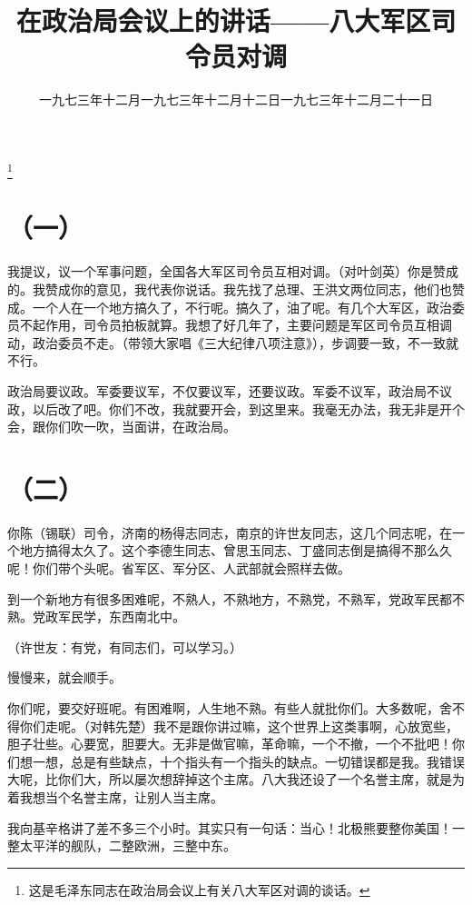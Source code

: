 
\title{在政治局会议上的讲话——八大军区司令员对调}
\date{一九七三年十二月}
\thanks{这是毛泽东同志在政治局会议上有关八大军区对调的谈话。}
\maketitle

\date{一九七三年十二月十二日}
\section*{（一）}

我提议，议一个军事问题，全国各大军区司令员互相对调。（对叶剑英）你是赞成的。我赞成你的意见，我代表你说话。我先找了总理、王洪文两位同志，他们也赞成。一个人在一个地方搞久了，不行呢。搞久了，油了呢。有几个大军区，政治委员不起作用，司令员拍板就算。我想了好几年了，主要问题是军区司令员互相调动，政治委员不走。（带领大家唱《三大纪律八项注意》），步调要一致，不一致就不行。

政治局要议政。军委要议军，不仅要议军，还要议政。军委不议军，政治局不议政，以后改了吧。你们不改，我就要开会，到这里来。我毫无办法，我无非是开个会，跟你们吹一吹，当面讲，在政治局。

\date{一九七三年十二月二十一日}
\section*{（二）}

你陈（锡联）司令，济南的杨得志同志，南京的许世友同志，这几个同志呢，在一个地方搞得太久了。这个李德生同志、曾思玉同志、丁盛同志倒是搞得不那么久呢！你们带个头呢。省军区、军分区、人武部就会照样去做。

到一个新地方有很多困难呢，不熟人，不熟地方，不熟党，不熟军，党政军民都不熟。党政军民学，东西南北中。

（许世友：有党，有同志们，可以学习。）

慢慢来，就会顺手。

你们呢，要交好班呢。有困难啊，人生地不熟。有些人就批你们。大多数呢，舍不得你们走呢。（对韩先楚）我不是跟你讲过嘛，这个世界上这类事啊，心放宽些，胆子壮些。心要宽，胆要大。无非是做官嘛，革命嘛，一个不撤，一个不批吧！你们想一想，总是有些缺点，十个指头有一个指头的缺点。一切错误都是我。我错误大呢，比你们大，所以屡次想辞掉这个主席。八大我还设了一个名誉主席，就是为着我想当个名誉主席，让别人当主席。

我向基辛格讲了差不多三个小时。其实只有一句话：当心！北极熊要整你美国！一整太平洋的舰队，二整欧洲，三整中东。

